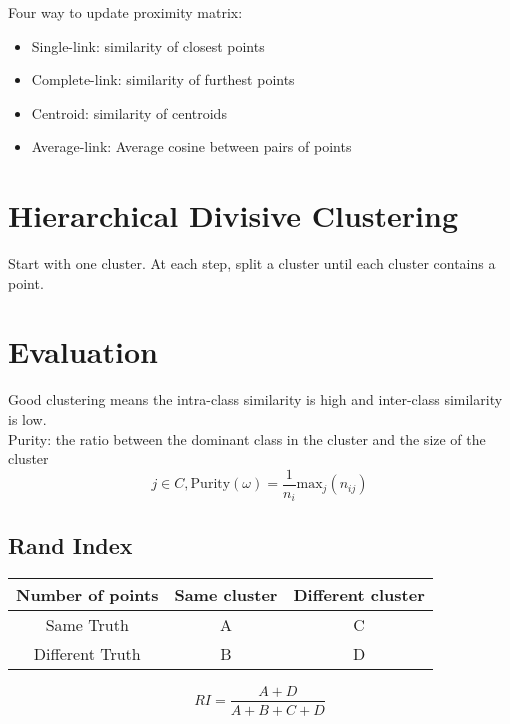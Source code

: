 \begin{multicols*}{2}
\noindent Four way to update proximity matrix:
\begin{itemize}
    \item Single-link: similarity of closest points
    \item Complete-link: similarity of furthest points
    \item Centroid: similarity of centroids
    \item Average-link: Average cosine between pairs of points
\end{itemize}

\section{Hierarchical Divisive Clustering}
Start with one cluster. At each step, split a cluster until each cluster contains a point. 

\section{Evaluation}
\noindent Good clustering means the intra-class similarity is high and inter-class similarity is low. \\

\noindent Purity: the ratio between the dominant class in the cluster and the size of the cluster
$$j\in C, \text{Purity}(\omega) = \frac{1}{n_i} \text{max}_j (n_{ij})$$

\subsection{Rand Index}

\begin{center}
\begin{tabular}{ |c|c c| } 
    \hline
    Number of points & Same cluster & Different cluster \\
    \hline 
    Same Truth & A & C \\
    Different Truth & B & D \\
    \hline
\end{tabular}
\end{center}

$$RI=\frac{A+D}{A+B+C+D}$$

\end{multicols*}
